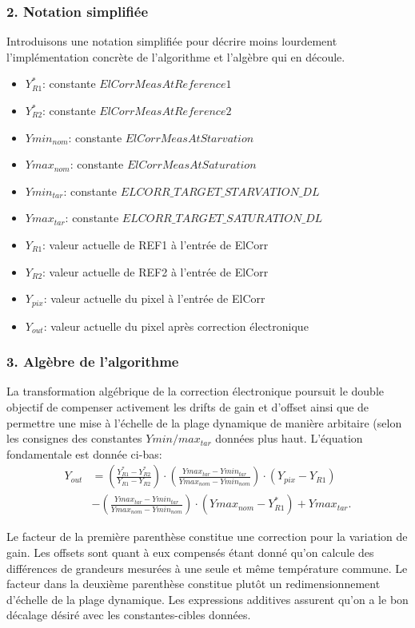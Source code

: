 \documentclass[11pt]{report}
\begin{document}
\subsubsection{2. Notation simplifiée}
Introduisons une notation simplifiée pour décrire moins lourdement l'implémentation concrète de l'algorithme et l'algèbre qui en découle.
\begin{itemize}[label=$\circ$]
\item $Y_{R1}^*$: constante $ElCorrMeasAtReference1$
\item $Y_{R2}^*$: constante $ElCorrMeasAtReference2$
\item $Ymin_{nom}$: constante $ElCorrMeasAtStarvation$
\item $Ymax_{nom}$: constante $ElCorrMeasAtSaturation$
\item $Ymin_{tar}$: constante $ELCORR\_TARGET\_STARVATION\_DL$
\item $Ymax_{tar}$: constante $ELCORR\_TARGET\_SATURATION\_DL$
\item $Y_{R1}$: valeur actuelle de REF1 à l'entrée de ElCorr
\item $Y_{R2}$: valeur actuelle de REF2 à l'entrée de ElCorr
\item $Y_{pix}$: valeur actuelle du pixel à l'entrée de ElCorr
\item $Y_{out}$: valeur actuelle du pixel après correction électronique
\end{itemize}

\subsubsection{3. Algèbre de l'algorithme}
La transformation algébrique de la correction électronique poursuit le double objectif de compenser activement les drifts de gain et d'offset ainsi que de permettre une mise à l'échelle de la plage dynamique de manière arbitaire (selon les consignes des constantes $Ymin/max_{tar}$ données plus haut. L'équation fondamentale est donnée ci-bas:
\begin{align*}
Y_{out} &=\left(\frac{Y_{R1}^*-Y_{R2}^*}{Y_{R1}-Y_{R2}}\right) \cdot 
	    \left(\frac{Ymax_{tar}-Ymin_{tar}}{Ymax_{nom}-Ymin_{nom}}\right) \cdot
        (Y_{pix}-Y_{R1})\\
        &- \left(\frac{Ymax_{tar}-Ymin_{tar}}{Ymax_{nom}-Ymin_{nom}}\right) \cdot
        (Ymax_{nom}-Y_{R1}^*) + Ymax_{tar}.
\end{align*}

Le facteur de la première parenthèse constitue une correction pour la variation de gain. Les offsets sont quant à eux compensés étant donné qu'on calcule des différences de grandeurs mesurées à une seule et même température commune. Le facteur dans la deuxième parenthèse constitue plutôt un redimensionnement d'échelle de la plage dynamique. Les expressions additives assurent qu'on a le bon décalage désiré avec les constantes-cibles données.
\end{document}
